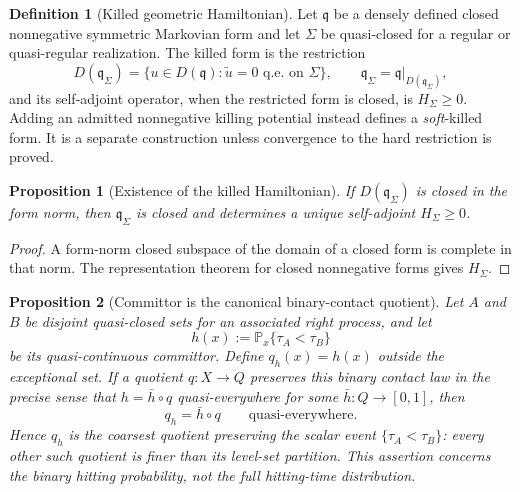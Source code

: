 \documentclass[11pt]{article}
\numberwithin{section}{part}
\theoremstyle{plain}
\newtheorem{proposition}[proposition]{Proposition}
\theoremstyle{definition}
\newtheorem{definition}[definition]{Definition}
\theoremstyle{remark}
\begin{document}
\begin{definition}[Killed geometric Hamiltonian]
\label{def:killed-hamiltonian}
Let \(\mathfrak q\) be a densely defined closed nonnegative symmetric
Markovian form and let \(\Sigma\) be quasi-closed for a regular or
quasi-regular realization.  The killed form is the restriction
\[
 D(\mathfrak q_\Sigma)
 =\{u\in D(\mathfrak q):\widetilde u=0\text{ q.e. on }\Sigma\},
 \qquad
 \mathfrak q_\Sigma=\mathfrak q|_{D(\mathfrak q_\Sigma)},
\]
and its self-adjoint operator, when the restricted form is closed, is
\(H_\Sigma\ge0\).  Adding an admitted nonnegative killing potential instead
defines a \emph{soft}-killed form.  It is a separate construction unless
convergence to the hard restriction is proved.
\end{definition}

\begin{proposition}[Existence of the killed Hamiltonian]
\label{prop:killed-hamiltonian-exists}
If \(D(\mathfrak q_\Sigma)\) is closed in the form norm, then
\(\mathfrak q_\Sigma\) is closed and determines a unique self-adjoint
\(H_\Sigma\ge0\).
\end{proposition}

\begin{proof}
A form-norm closed subspace of the domain of a closed form is complete in that
norm.  The representation theorem for closed nonnegative forms gives
\(H_\Sigma\).
\end{proof}

\begin{proposition}[Committor is the canonical binary-contact quotient]
\label{prop:committor-contact-quotient}
Let \(A\) and \(B\) be disjoint quasi-closed sets for an associated right
process, and let
\[
 h(x):=\mathbb P_x\{\tau_A<\tau_B\}
\]
be its quasi-continuous committor.  Define \(q_h(x)=h(x)\) outside the
exceptional set.  If a quotient \(q:X\to Q\) preserves this binary contact
law in the precise sense that \(h=\bar h\circ q\) quasi-everywhere for some
\(\bar h:Q\to[0,1]\), then
\begin{equation}
 \label{eq:committor-quotient-factorization}
 q_h=\bar h\circ q
 \qquad\text{quasi-everywhere}.
\end{equation}
Hence \(q_h\) is the coarsest quotient preserving the scalar event
\(\{\tau_A<\tau_B\}\): every other such quotient is finer than its level-set
partition.  This assertion concerns the binary hitting probability, not the
full hitting-time distribution.
\end{proposition}
\end{document}
